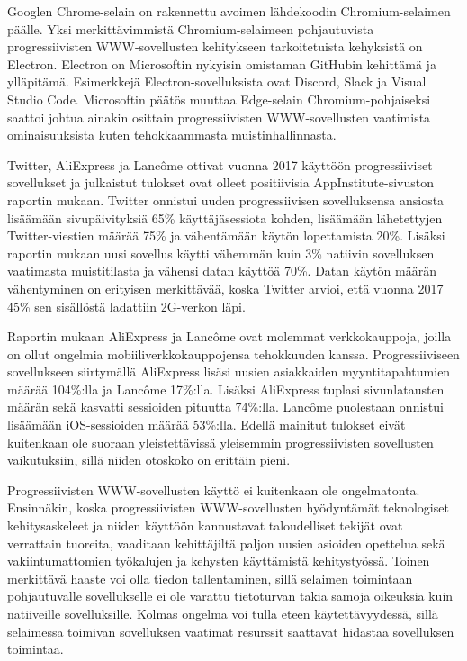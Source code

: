 \documentclass[utf8]{gradu3}
\begin{document}
Googlen Chrome-selain on rakennettu avoimen lähdekoodin Chromium-selaimen päälle. Yksi merkittävimmistä Chromium-selaimeen pohjautuvista progressiivisten WWW\nobreakdash-\hspace{0pt}sovellusten kehitykseen tarkoitetuista kehyksistä on Electron. Electron on Microsoftin nykyisin omistaman GitHubin kehittämä ja ylläpitämä. Esimerkkejä Electron-sovelluksista ovat Discord, Slack ja Visual Studio Code. Microsoftin päätös muuttaa Edge-selain Chromium-pohjaiseksi saattoi johtua ainakin osittain progressiivisten WWW-sovellusten vaatimista ominaisuuksista kuten tehokkaammasta muistinhallinnasta.

Twitter, AliExpress ja Lancôme ottivat vuonna 2017 käyttöön progressiiviset sovellukset ja julkaistut tulokset ovat olleet positiivisia AppInstitute-sivuston raportin mukaan. Twitter onnistui uuden progressiivisen sovelluksensa ansiosta lisäämään sivupäivityksiä 65\% käyttäjäsessiota kohden, lisäämään lähetettyjen Twitter-viestien määrää 75\% ja vähentämään käytön lopettamista 20\%. Lisäksi raportin mukaan uusi sovellus käytti vähemmän kuin 3\% natiivin sovelluksen vaatimasta muistitilasta ja vähensi datan käyttöä 70\%. Datan käytön määrän vähentyminen on erityisen merkittävää, koska Twitter arvioi, että vuonna 2017 45\% sen sisällöstä ladattiin 2G-verkon läpi. \parencite[]{beginners-guide-pwa}

Raportin mukaan AliExpress ja Lancôme ovat molemmat verkkokauppoja, joilla on ollut ongelmia mobiiliverkkokauppojensa tehokkuuden kanssa. Progressiiviseen sovellukseen siirtymällä AliExpress lisäsi uusien asiakkaiden myyntitapahtumien määrää 104\%:lla ja Lancôme 17\%:lla. Lisäksi AliExpress tuplasi sivunlatausten määrän sekä kasvatti sessioiden pituutta 74\%:lla. Lancôme puolestaan onnistui lisäämään iOS-sessioiden määrää 53\%:lla. Edellä mainitut tulokset eivät kuitenkaan ole suoraan yleistettävissä yleisemmin progressiivisten sovellusten vaikutuksiin, sillä niiden otoskoko on erittäin pieni. \parencite[]{beginners-guide-pwa}

Progressiivisten WWW-sovellusten käyttö ei kuitenkaan ole ongelmatonta. Ensinnäkin, koska progressiivisten WWW-sovellusten hyödyntämät teknologiset kehitysaskeleet ja niiden käyttöön kannustavat taloudelliset tekijät ovat verrattain tuoreita, vaaditaan kehittäjiltä paljon uusien asioiden opettelua sekä vakiintumattomien työkalujen ja kehysten käyttämistä kehitystyössä. Toinen merkittävä haaste voi olla tiedon tallentaminen, sillä selaimen toimintaan pohjautuvalle sovellukselle ei ole varattu tietoturvan takia samoja oikeuksia kuin natiiveille sovelluksille. Kolmas ongelma voi tulla eteen käytettävyydessä, sillä selaimessa toimivan sovelluksen vaatimat resurssit saattavat hidastaa sovelluksen toimintaa. \parencite[]{pwa-design-challenges}
\end{document}
